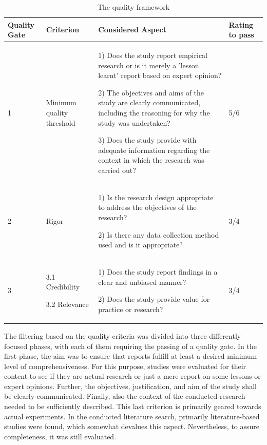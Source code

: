 \documentclass[conference]{IEEEtran}
\begin{document}
\begin{table}[h]
    \renewcommand{\arraystretch}{1.5}
    \caption[]{The quality framework}
    \begin{tabular}{|p{2cm}|p{3cm}|p{9.5cm}|p{2cm}|}
        \hline
        Quality Gate & Criterion & Considered Aspect & Rating to pass \\ 

        \hline

        1 & Minimum quality threshold & 
        
        1) Does the study report empirical research or is it merely a 'lesson learnt' report based on expert opinion?

        2) The objectives and aims of the study are clearly communicated, including the reasoning for why the study was undertaken?

        3) Does the study provide with adequate information regarding the context in which the research was carried out?
        & 5/6 \\ 
        \hline
        2 & Rigor & 
        
        1) Is the research design appropriate to address the objectives of the research?

        2) Is there any data collection method used and is it appropriate?
        & 3/4 \\ 
        \hline  
        3 &
        3.1 Credibility 

        3.2 Relevance 
        & 
        1) Does the study report findings in a clear and unbiased manner?

        2) Does the study provide value for practice or research?
        & 
        3/4 \\ 
        \hline   
    \end{tabular}
    \label{qualityFramework}
\end{table}

The filtering based on the quality criteria was divided into three differently focused phases, with each of them requiring the passing of a quality gate. In the first phase, the aim was to ensure that reports fulfill at least a desired minimum level of comprehensiveness. For this purpose, studies were evaluated for their content to see if they are actual research or just a mere report on some lessons or expert opinions. Further, the objectives, justification, and aim of the study shall be clearly communicated. Finally, also the context of the conducted research needed to be sufficiently described. This last criterion is primarily geared towards actual experiments. In the conducted literature search, primarily literature-based studies were found, which somewhat devalues this aspect. Nevertheless, to assure completeness, it was still evaluated. 
\end{document}
